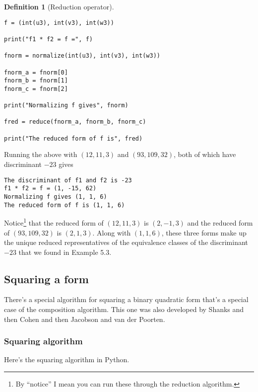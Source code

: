 \documentclass{article}
\theoremstyle{definition}
\newtheorem{definition}{Definition}[section]
\theoremstyle{theorem}
\theoremstyle{example}
\theoremstyle{corollary}
\begin{document}
\begin{definition}[Reduction operator]
\begin{verbatim}
f = (int(u3), int(v3), int(w3))

print("f1 * f2 = f =", f)

fnorm = normalize(int(u3), int(v3), int(w3))

fnorm_a = fnorm[0]
fnorm_b = fnorm[1]
fnorm_c = fnorm[2]

print("Normalizing f gives", fnorm)

fred = reduce(fnorm_a, fnorm_b, fnorm_c)

print("The reduced form of f is", fred)
\end{verbatim}

\bigskip

\hline

\bigskip

Running the above with \((12, 11, 3)\) and \((93, 109, 32)\), both of which have discriminant \(-23\) gives

\begin{verbatim}
The discriminant of f1 and f2 is -23
f1 * f2 = f = (1, -15, 62)
Normalizing f gives (1, 1, 6)
The reduced form of f is (1, 1, 6)
\end{verbatim}

\bigskip

Notice\footnote{By ``notice'' I mean you can run these through the reduction algorithm.} that the reduced form of \((12, 11, 3)\) is \((2, -1, 3)\) and the reduced form of \((93, 109, 32)\) is \((2, 1, 3)\). Along with \((1, 1, 6)\), these three forms make up the unique reduced representatives of the equivalence classes of the discriminant \(-23\) that we found in Example 5.3.

\bigskip

\subsection{Squaring a form}

\bigskip

There's a special algorithm for squaring a binary quadratic form that's a special case of the composition algorithm. This one was also developed by Shanks and then Cohen and then Jacobson and van der Poorten.

\bigskip

\subsubsection{Squaring algorithm}

\bigskip

Here's the squaring algorithm in Python.


\end{definition}
\end{document}
